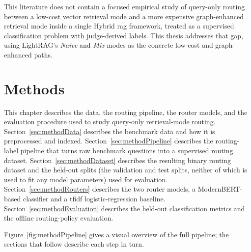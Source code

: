 \documentclass[english, bibtex]{kththesis}               %
\numberwithin{listing}{chapter}
\begin{document}
This literature does not contain a focused empirical study of query-only routing between a low-cost vector retrieval mode and a more expensive graph-enhanced retrieval mode inside a single Hybrid \gls{rag} framework, treated as a supervised classification problem with judge-derived labels. This thesis addresses that gap, using LightRAG's \emph{Naive} and \emph{Mix} modes as the concrete low-cost and graph-enhanced paths.

\cleardoublepage
\chapter{Methods}
\label{ch:methods}

This chapter describes the data, the routing pipeline, the router models, and the evaluation procedure used to study query-only retrieval-mode routing. Section~\ref{sec:methodData} describes the benchmark data and how it is preprocessed and indexed. Section~\ref{sec:methodPipeline} describes the routing-label pipeline that turns raw benchmark questions into a supervised routing dataset. Section~\ref{sec:methodDataset} describes the resulting binary routing dataset and the held-out splits (the validation and test splits, neither of which is used to fit any model parameters) used for evaluation. Section~\ref{sec:methodRouters} describes the two router models, a ModernBERT-based classifier and a \gls{tfidf} logistic-regression baseline. Section~\ref{sec:methodEvaluation} describes the held-out classification metrics and the offline routing-policy evaluation.

Figure~\ref{fig:methodPipeline} gives a visual overview of the full pipeline; the sections that follow describe each step in turn.
\end{document}
